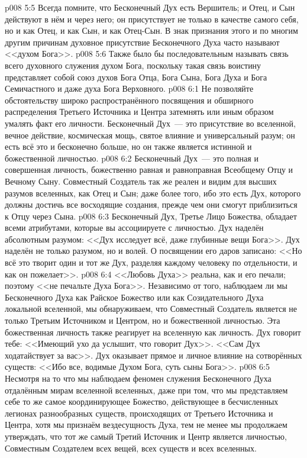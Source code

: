\vs p008 5:5 Всегда помните, что Бесконечный Дух есть  Вершитель; и Отец, и Сын действуют в нём и через него; он присутствует не только в качестве самого себя, но и как Отец, и как Сын, и как Отец-Сын. В знак признания этого и по многим другим причинам духовное присутствие Бесконечного Духа часто называют <<духом Бога>>.
\vs p008 5:6 Также было бы последовательным называть связь всего духовного служения духом Бога, поскольку такая связь воистину представляет собой союз духов Бога Отца, Бога Сына, Бога Духа и Бога Семичастного и даже духа Бога Верховного.
\vs p008 6:1 Не позволяйте обстоятельству широко распространённого посвящения и обширного распределения Третьего Источника и Центра затемнять или иным образом умалять факт его личности. Бесконечный Дух~--- это присутствие во вселенной, вечное действие, космическая мощь, святое влияние и универсальный разум; он есть всё это и бесконечно больше, но он также является истинной и божественной личностью.
\vs p008 6:2 Бесконечный Дух~--- это полная и совершенная личность, божественно равная и равноправная Всеобщему Отцу и Вечному Сыну. Совместный Создатель так же реален и видим для высших разумов вселенных, как Отец и Сын; даже более того, ибо это есть Дух, которого должны достичь все восходящие создания, прежде чем они смогут приблизиться к Отцу через Сына.
\vs p008 6:3 Бесконечный Дух, Третье Лицо Божества, обладает всеми атрибутами, которые вы ассоциируете с личностью. Дух наделён абсолютным разумом: <<Дух исследует всё, даже глубинные вещи Бога>>. Дух наделён не только разумом, но и волей. О посвящении его даров записано: <<Но всё это творит один и тот же Дух, разделяя каждому человеку по отдельности, и как он пожелает>>.
\vs p008 6:4 <<Любовь Духа>> реальна, как и его печали; поэтому <<не печальте Духа Бога>>. Независимо от того, наблюдаем ли мы Бесконечного Духа как Райское Божество или как Созидательного Духа локальной вселенной, мы обнаруживаем, что Совместный Создатель является не только Третьим Источником и Центром, но и божественной личностью. Эта божественная личность также реагирует на вселенную как личность. Дух говорит тебе: <<Имеющий ухо да услышит, что говорит Дух>>. <<Сам Дух ходатайствует за вас>>. Дух оказывает прямое и личное влияние на сотворённых существ: <<Ибо все, водимые Духом Бога, суть сыны Бога>>.
\vs p008 6:5 Несмотря на то что мы наблюдаем феномен служения Бесконечного Духа отдалённым мирам вселенной вселенных, даже при том, что мы представляем себе то же самое координирующее Божество, действующее в бесчисленных легионах разнообразных существ, происходящих от Третьего Источника и Центра, хотя мы признаём вездесущность Духа, тем не менее мы продолжаем утверждать, что тот же самый Третий Источник и Центр является личностью, Совместным Создателем всех вещей, всех существ и всех вселенных.
